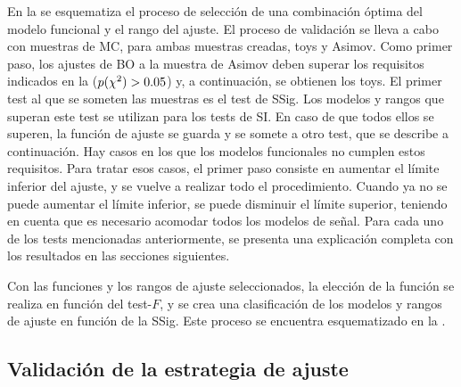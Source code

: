 En la \Fig{\ref{fig:bkg:modeling:strategy:validation:tests}} se esquematiza el proceso de selección de una combinación óptima del modelo funcional y el rango del ajuste.
El proceso de validación se lleva a cabo con muestras de \ac{MC}, para ambas muestras creadas, toys y Asimov. Como primer paso, los ajustes de \ac{BO} a la muestra de Asimov deben superar los requisitos indicados en la \Fig{\ref{fig:bkg:modeling:preparation:datasets_generation}} (\(p(\chi^{2}) > 0.05\)) y, a continuación, se obtienen los toys. El primer test al que se someten las muestras es el test de \acf{SSig}. Los modelos y rangos que superan este test se utilizan para los tests de \acf{SI}. En caso de que todos ellos se superen, la función de ajuste se guarda y se somete a otro test, que se describe a continuación. Hay casos en los que los modelos funcionales no cumplen estos requisitos. Para tratar esos casos, el primer paso consiste en aumentar el límite inferior del ajuste, y se vuelve a realizar todo el procedimiento. Cuando ya no se puede aumentar el límite inferior, se puede disminuir el límite superior, teniendo en cuenta que es necesario acomodar todos los modelos de señal. Para cada uno de los tests mencionadas anteriormente, se presenta una explicación completa con los resultados en las secciones siguientes.

Con las funciones y los rangos de ajuste seleccionados, la elección de la función se realiza en función del test-\(F\), y se crea una clasificación de los modelos y rangos de ajuste en función de la \ac{SSig}. Este proceso se encuentra esquematizado en la \Fig{\ref{fig:bkg:modeling:strategy:validation:function_selection}}.







































\subsection{Validación de la estrategia de ajuste}
\label{subsec:bkg:modeling:sigbkg}

